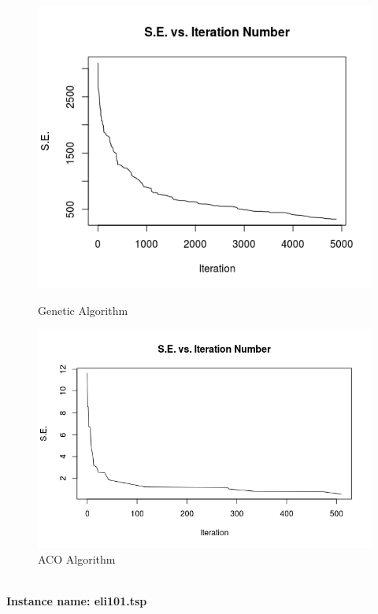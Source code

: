 \documentclass[11pt,a4paper,final]{article}
\begin{document}
	\begin{figure}[H]
		\begin{minipage}{.5\textwidth}
			\centering
			\includegraphics[scale= 0.4]{ch130GAPlot}
			\caption{Genetic Algorithm}
			\label{fig:ch130GA}
		\end{minipage}
		\begin{minipage}{.5\textwidth}
			\centering
			\includegraphics[scale=0.4]{ch130ACOPlot}
			\caption{ACO Algorithm}					
			\label{fig:ch130ACO}
		\end{minipage}
	\end{figure}
	\hspace{0pt}\\
	\textbf{Instance name: eli101.tsp}\\
\end{document}
